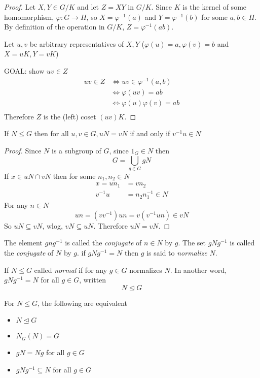 \begin{proof}
  Let $X, Y \in G/K$ and let $Z = XY$ in $G/K$. Since $K$ is the kernel of some homomorphism,
  $\varphi: G \to H$, so $X = \varphi^{-1}(a)$ and $Y = \varphi^{-1}(b)$ for some $a, b \in H$.
  By definition of the operation in $G/K$, $Z = \varphi^{-1}(ab)$. 

  Let $u, v$ be arbitrary representatives of $X, Y$ ($\varphi(u) = a, \varphi(v)=b$ and $X = uK, Y = vK$)

  GOAL: show $uv \in Z$
  \begin{align*}
    uv \in Z &\iff uv \in \varphi^{-1}(a, b) \\
    &\iff \varphi(uv) = ab \\
    &\iff \varphi(u)\varphi(v) = ab \\ 
  \end{align*}
  Therefore $Z$ is the (left) coset $(uv)K$.
\end{proof}

\begin{proposition}
  If $N \le G$ then for all $u, v \in G, uN = vN$ if and only if $v^{-1}u\in N$
\end{proposition}

\begin{proof}
  Since $N$ is a subgroup of $G$, since $1_G \in N$ then 
  \[G = \bigcup_{g \in G} gN\]
  If $x \in uN \cap vN$ then for some $n_1, n_2 \in N$
  \begin{align*}
    x = un_1 &= vn_2 \\ 
    v^{-1}u &= n_2 n_1^{-1} \in N
  \end{align*}
  For any $n \in N$
  \[un = (vv^{-1})un = v(v^{-1}un) \in vN\]
  So $uN \subseteq vN$, wlog, $vN \subseteq uN$. Therefore $uN = vN$.
\end{proof}

\begin{definition}
  The element $gng^{-1}$ is called the \textit{conjugate} of $n \in N$ by $g$.
  The set $gNg^{-1}$ is called the \textit{conjugate} of $N$ by $g$.
  if $gNg^{-1} = N$ then $g$ is said to \textit{normalize} $N$. 

  If $N \le G$ called \textit{normal} if for any $g \in G$ normalizes $N$. In another word, $gNg^{-1} = N$ for all $g \in G$, written
  \[N \trianglelefteq G\]
\end{definition}

\begin{theorem}
  For $N \le G$, the following are equivalent
  \begin{itemize}
    \item $N \trianglelefteq G$
    \item $N_G(N) = G$
    \item $gN = Ng$ for all $g \in G$

    \item $gNg^{-1} \subseteq N$ for all $g \in G$
  \end{itemize}
\end{theorem}